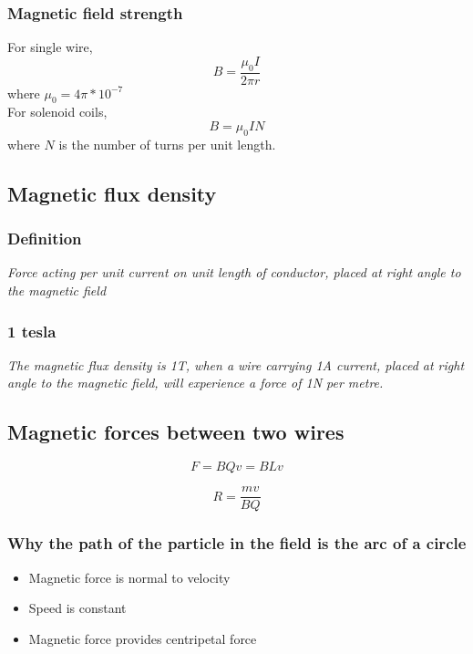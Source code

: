 \documentclass[a4paper,9pt]{scrartcl}
\begin{document}
    \subsubsection{Magnetic field strength}
    For single wire,
    \begin{displaymath}
        B = \frac{{\mu_0}I}{2{\pi}r}
    \end{displaymath}
    where $\mu_0 = 4\pi*10^{-7}$ \\

    For solenoid coils,
    \begin{displaymath}
        B = {\mu_0}IN
    \end{displaymath}
    where $N$ is the number of turns per unit length.

    \subsection{Magnetic flux density}

    \subsubsection{Definition}
    \textit{Force acting per unit current on unit length of conductor, placed at right angle to the magnetic field}

    \subsubsection{1 tesla}
    \textit{The magnetic flux density is 1T, when a wire carrying 1A current, placed at right angle to the magnetic field, will experience a force of 1N per metre.}

    \subsection{Magnetic forces between two wires}

    \begin{displaymath}
        F = BQv = BLv
    \end{displaymath}

    \begin{displaymath}
        R = \frac{mv}{BQ}
    \end{displaymath}

    \subsubsection{Why the path of the particle in the field is the arc of a circle}
    \begin{itemize}
        \item Magnetic force is normal to velocity
        \item Speed is constant
        \item Magnetic force provides centripetal force
    \end{itemize}
\end{document}
